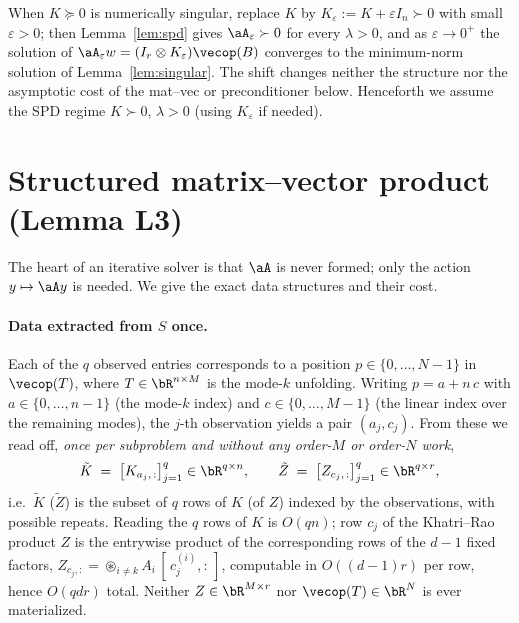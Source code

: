 \begin{remark}\label{rem:reg}
When $K\succeq0$ is numerically singular, replace $K$ by
$K_\varepsilon:=K+\varepsilon I_n\succ0$ with small $\varepsilon>0$; then
Lemma~\ref{lem:spd} gives $\aA_\varepsilon\succ0$ for every $\lambda>0$, and as
$\varepsilon\to0^{+}$ the solution of
$\aA_\varepsilon w=(I_r\otimes K_\varepsilon)\vecop(B)$ converges to the
minimum-norm solution of Lemma~\ref{lem:singular}. The shift changes neither
the structure nor the asymptotic cost of the mat--vec or preconditioner below.
Henceforth we assume the SPD regime $K\succ0$, $\lambda>0$ (using
$K_\varepsilon$ if needed).
\end{remark}

\section*{Structured matrix--vector product (Lemma L3)}

The heart of an iterative solver is that $\aA$ is never formed; only the action
$y\mapsto \aA y$ is needed. We give the exact data structures and their cost.

\paragraph{Data extracted from $S$ once.}
Each of the $q$ observed entries corresponds to a position $p\in\{0,\dots,N-1\}$
in $\vecop(T)$, where $T\in\bR^{n\times M}$ is the mode-$k$ unfolding. Writing
$p=a+n\,c$ with $a\in\{0,\dots,n-1\}$ (the mode-$k$ index) and
$c\in\{0,\dots,M-1\}$ (the linear index over the remaining modes), the $j$-th
observation yields a pair $(a_j,c_j)$. From these we read off, \emph{once per
subproblem and without any order-$M$ or order-$N$ work},
\begin{equation}\label{eq:tilde}
  \tilde K \;=\; \bigl[K_{a_j,\,:}\bigr]_{j=1}^{q}\in\bR^{q\times n},
  \qquad
  \tilde Z \;=\; \bigl[Z_{c_j,\,:}\bigr]_{j=1}^{q}\in\bR^{q\times r},
\end{equation}
i.e.\ $\tilde K$ ($\tilde Z$) is the subset of $q$ rows of $K$ (of $Z$) indexed
by the observations, with possible repeats. Reading the $q$ rows of $K$ is
$O(qn)$; row $c_j$ of the Khatri--Rao product $Z$ is the entrywise product of
the corresponding rows of the $d-1$ fixed factors,
$Z_{c_j,:}=\circledast_{i\neq k}A_i\,[\,c_j^{(i)},:\,]$, computable in
$O((d-1)r)$ per row, hence $O(qdr)$ total. Neither $Z\in\bR^{M\times r}$ nor
$\vecop(T)\in\bR^{N}$ is ever materialized.

